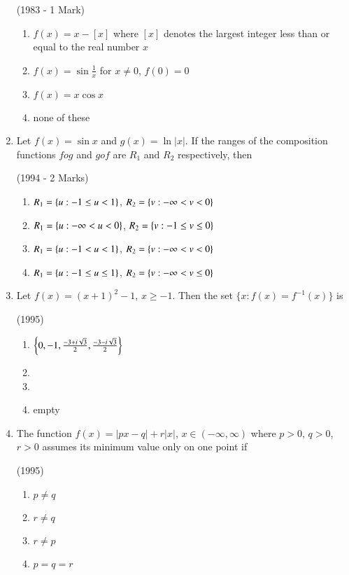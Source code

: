 \documentclass[journal,12pt,twocolumn]{IEEEtran}
\theoremstyle{remark}
\begin{document}
\begin{enumerate}
\hfill{(1983 - 1 Mark)}

\begin{enumerate}
\item $f(x)=x-\left[x\right]$ where $\left[x\right]$ denotes the largest integer less than or equal to the real number $x$
\item $f(x)=\sin{\frac{1}{x}}$ for $x\neq0$, $f(0)=0$
\item $f(x)=x\cos{x}$
\item none of these
\end{enumerate}

\item Let $f(x)=\sin{x}$ and $g(x)=\ln{|x|}$. If the ranges of the composition functions $fog$ and $gof$ are $R_1$ and $R_2$ respectively, then 

\hfill{(1994 - 2 Marks)}

\begin{enumerate}
\item $R_1=\left\{u:-1\le u<1\right\}$, $R_2=\left\{v:-\infty<v<0\right\}$
\item $R_1=\left\{u:-\infty<u<0\right\}$, $R_2=\left\{v:-1\le v\le0\right\}$
\item $R_1=\left\{u:-1<u<1\right\}$, $R_2=\left\{v:-\infty<v<0\right\}$
\item $R_1=\left\{u:-1\le u\le1\right\}$, $R_2=\left\{v:-\infty<v\le0\right\}$
\end{enumerate}

\item Let $f(x)=(x+1)^{2}-1$, $x\ge-1$. Then the set $\{x:f(x)=f^{-1}(x)\}$ is

\hfill{(1995)}

\begin{enumerate}
\item $\left\{0, -1, \frac{-3+i\sqrt{3}}{2}, \frac{-3-i\sqrt{3}}{2}\right\}$
\item {}
\item {}
\item empty
\end{enumerate}

\item The function $f(x)=|px-q|+r|x|$, $x\in(-\infty,\infty)$ where $p>0$, $q>0$, $r>0$ assumes its minimum value only on one point if

\hfill{(1995)}

\begin{multicols}{2}
	\begin{enumerate}
		\item $p\neq q$
		\item $r\neq q$
		\item $r\neq p$ 
		\item $p=q=r$
	\end{enumerate}
\end{multicols}


\end{enumerate}
\end{document}
